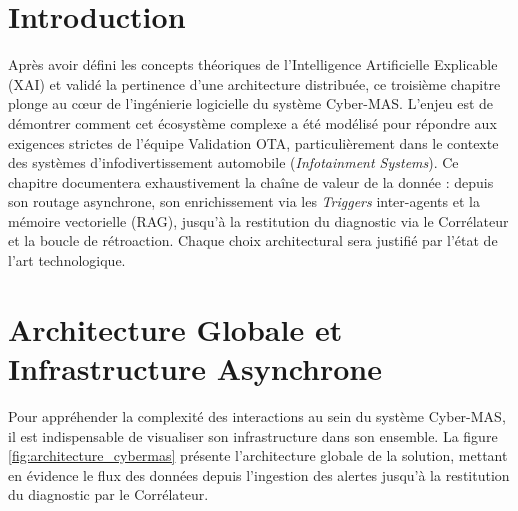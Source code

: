 \documentclass[a4paper, 12pt]{report}
\begin{document}
\section*{Introduction}
Après avoir défini les concepts théoriques de l'Intelligence Artificielle Explicable (XAI) et validé la pertinence d'une architecture distribuée, ce troisième chapitre plonge au cœur de l'ingénierie logicielle du système Cyber-MAS. L'enjeu est de démontrer comment cet écosystème complexe a été modélisé pour répondre aux exigences strictes de l'équipe Validation OTA, particulièrement dans le contexte des systèmes d'infodivertissement automobile (\textit{Infotainment Systems}). Ce chapitre documentera exhaustivement la chaîne de valeur de la donnée : depuis son routage asynchrone, son enrichissement via les \textit{Triggers} inter-agents et la mémoire vectorielle (RAG), jusqu'à la restitution du diagnostic via le Corrélateur et la boucle de rétroaction. Chaque choix architectural sera justifié par l'état de l'art technologique.

\section{Architecture Globale et Infrastructure Asynchrone}
\label{sec:architecture_globale}

Pour appréhender la complexité des interactions au sein du système Cyber-MAS, il est indispensable de visualiser son infrastructure dans son ensemble. La figure \ref{fig:architecture_cybermas} présente l'architecture globale de la solution, mettant en évidence le flux des données depuis l'ingestion des alertes jusqu'à la restitution du diagnostic par le Corrélateur.
\end{document}
